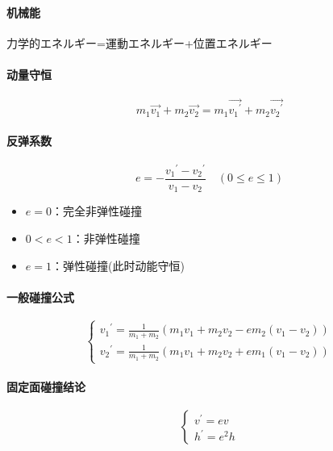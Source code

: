 \paragraph{机械能}
\begin{center}
    力学的エネルギー=運動エネルギー+位置エネルギー
\end{center}

\paragraph{动量守恒}
\begin{equation*}
    m_1\vec{v_1}+m_2\vec{v_2}=m_1\vec{{v_1}^\prime}+m_2\vec{{v_2}^\prime}
\end{equation*}

\paragraph{反弹系数}
\begin{equation*}
    e=-\frac{{v_1}^\prime-{v_2}^\prime}{v_1-v_2}\quad(0\le e\le1)
\end{equation*}
\begin{itemize}
    \item $e=0$：完全非弹性碰撞
    \item $0<e<1$：非弹性碰撞
    \item $e=1$：弹性碰撞(此时动能守恒)
\end{itemize}

\paragraph{一般碰撞公式}
\begin{equation*}
    \begin{cases}
        {v_1}^\prime=\frac{1}{m_1+m_2}(m_1v_1+m_2v_2-em_2(v_1-v_2))\\
        {v_2}^\prime=\frac{1}{m_1+m_2}(m_1v_1+m_2v_2+em_1(v_1-v_2))
    \end{cases}
\end{equation*}

\paragraph{固定面碰撞结论}
\begin{equation*}
    \begin{cases}
        v^\prime=ev\\
        h^\prime=e^2h
    \end{cases}
\end{equation*}

